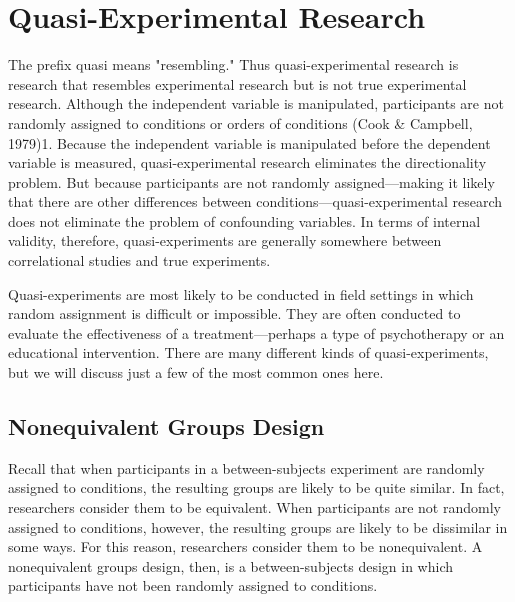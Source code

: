 \newpage
\section{Quasi-Experimental Research}


The prefix quasi means "resembling." Thus quasi-experimental research is research that resembles experimental research but is not true experimental research. Although the independent variable is manipulated, participants are not randomly assigned to conditions or orders of conditions (Cook \& Campbell, 1979)1. Because the independent variable is manipulated before the dependent variable is measured, quasi-experimental research eliminates the directionality problem. But because participants are not randomly assigned---making it likely that there are other differences between conditions---quasi-experimental research does not eliminate the problem of confounding variables. In terms of internal validity, therefore, quasi-experiments are generally somewhere between correlational studies and true experiments.

Quasi-experiments are most likely to be conducted in field settings in which random assignment is difficult or impossible. They are often conducted to evaluate the effectiveness of a treatment---perhaps a type of psychotherapy or an educational intervention. There are many different kinds of quasi-experiments, but we will discuss just a few of the most common ones here.

\subsection{Nonequivalent Groups Design}

Recall that when participants in a between-subjects experiment are randomly assigned to conditions, the resulting groups are likely to be quite similar. In fact, researchers consider them to be equivalent. When participants are not randomly assigned to conditions, however, the resulting groups are likely to be dissimilar in some ways. For this reason, researchers consider them to be nonequivalent. A nonequivalent groups design, then, is a between-subjects design in which participants have not been randomly assigned to conditions.

